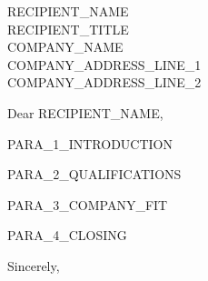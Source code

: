 \documentclass[11pt,a4paper]{letter}
\begin{document}
\begin{letter}{
    {{RECIPIENT_NAME}} \\
    {{RECIPIENT_TITLE}} \\
    {{COMPANY_NAME}} \\
    {{COMPANY_ADDRESS_LINE_1}} \\
    {{COMPANY_ADDRESS_LINE_2}}
}

\opening{Dear {{RECIPIENT_NAME}},}


{{PARA_1_INTRODUCTION}}

{{PARA_2_QUALIFICATIONS}}

{{PARA_3_COMPANY_FIT}}

{{PARA_4_CLOSING}}

\closing{Sincerely,}


\end{letter}
\end{document}

